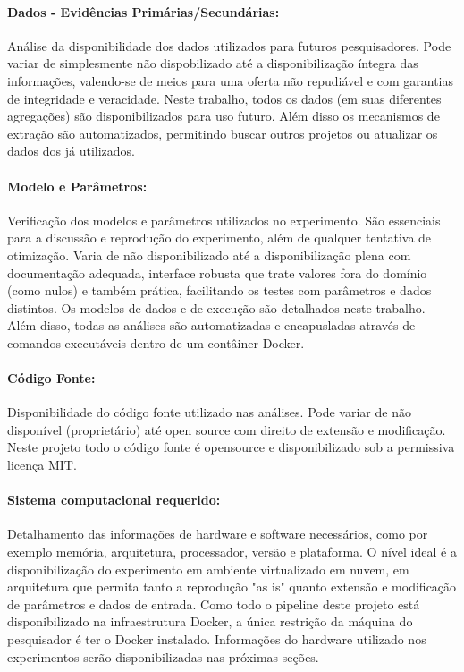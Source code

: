 \documentclass[a4paper,12pt]{monografia}
\theoremstyle{plain}
\theoremstyle{definition}
\theoremstyle{remark}
\begin{document}
\paragraph{Dados - Evidências Primárias/Secundárias:} Análise da disponibilidade dos dados utilizados para futuros pesquisadores. Pode variar de simplesmente não dispobilizado até a disponibilização íntegra das informações, valendo-se de meios para uma oferta não repudiável e com garantias de integridade e veracidade. Neste trabalho, todos os dados (em suas diferentes agregações) são disponibilizados para uso futuro. Além disso os mecanismos de extração são automatizados, permitindo buscar outros projetos ou atualizar os dados dos já utilizados.

\paragraph{Modelo e Parâmetros:} Verificação dos modelos e parâmetros utilizados no experimento. São essenciais para a discussão e reprodução do experimento, além de qualquer tentativa de otimização. Varia de não disponibilizado até a disponibilização plena com documentação adequada, interface robusta que trate valores fora do domínio (como nulos) e também prática, facilitando os testes com parâmetros e dados distintos. Os modelos de dados e de execução são detalhados neste trabalho. Além disso, todas as análises são automatizadas e encapusladas através de comandos executáveis dentro de um contâiner Docker.

\paragraph{Código Fonte:} Disponibilidade do código fonte utilizado nas análises. Pode variar de não disponível (proprietário) até open source com direito de extensão e modificação. Neste projeto todo o código fonte é opensource e disponibilizado sob a permissiva licença MIT.

\paragraph{Sistema computacional requerido:} Detalhamento das informações de hardware e software necessários, como por exemplo memória, arquitetura, processador, versão e plataforma. O nível ideal é a disponibilização do experimento em ambiente virtualizado em nuvem, em arquitetura que permita tanto a reprodução "as is" quanto extensão e modificação de parâmetros e dados de entrada. Como todo o pipeline deste projeto está disponibilizado na infraestrutura Docker, a única restrição da máquina do pesquisador é ter o Docker instalado. Informações do hardware utilizado nos experimentos serão disponibilizadas nas próximas seções.
\end{document}
